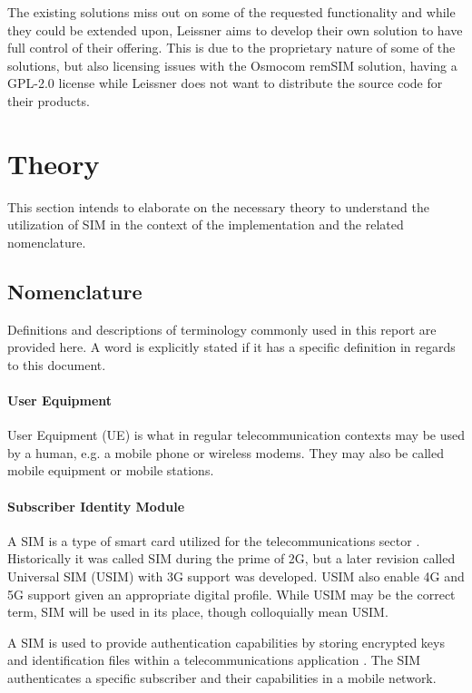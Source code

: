 The existing solutions miss out on some of the requested
functionality and while they could be extended upon, Leissner aims
to develop their own solution to have full control of their
offering. This is due to the proprietary nature of some of the
solutions, but also licensing issues with the Osmocom remSIM
solution, having a GPL-2.0 license while Leissner does not want to
distribute the source code for their products.

\section{Theory}

This section intends to elaborate on the necessary theory to
understand the utilization of SIM in the context of the
implementation and the related nomenclature.

\subsection{Nomenclature}

Definitions and descriptions of terminology commonly used in this
report are provided here. A word is explicitly stated if it has
a specific definition in regards to this document.

\paragraph{User Equipment}

User Equipment (UE) is what in regular telecommunication contexts
may be used by a human, e.g. a mobile phone or wireless modems.
They may also be called mobile equipment or mobile stations.

\paragraph{Subscriber Identity Module}

A SIM is a type of smart card utilized for the telecommunications sector
\cite{etsi-ts-131-102}. Historically it was called SIM during the prime of 2G,
but a later revision called Universal SIM (USIM) with 3G \cite{etsi-ts-131-102}
support was developed. USIM also enable 4G and 5G support given an
appropriate digital profile. While USIM may be the correct term, SIM
will be used in its place, though colloquially mean USIM.

A SIM is used to provide authentication capabilities by storing
encrypted keys and identification files within a telecommunications
application \cite{etsi-ts-131-102}. The SIM authenticates a
specific subscriber and their capabilities in a mobile network.


